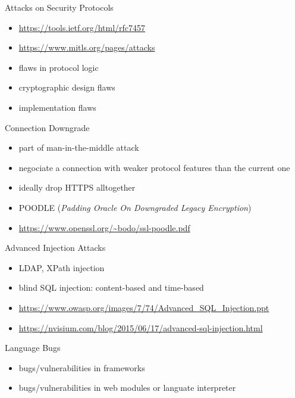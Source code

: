 \documentclass{curs}
\begin{document}
\begin{frame}{Attacks on Security Protocols}
  \begin{itemize}
    \pause \item \url{https://tools.ietf.org/html/rfc7457}
    \pause \item \url{https://www.mitls.org/pages/attacks}
    \pause \item flaws in protocol logic
    \pause \item cryptographic design flaws
    \pause \item implementation flaws
  \end{itemize}
\end{frame}

\begin{frame}{Connection Downgrade}
  \begin{itemize}
    \pause \item part of man-in-the-middle attack
    \pause \item negociate a connection with weaker protocol features than the current one
    \pause \item ideally drop HTTPS alltogether
    \pause \item POODLE (\textit{Padding Oracle On Downgraded Legacy Encryption})
    \pause \item \url{https://www.openssl.org/~bodo/ssl-poodle.pdf}
  \end{itemize}
\end{frame}

\begin{frame}{Advanced Injection Attacks}
  \begin{itemize}
    \pause \item LDAP, XPath injection
    \pause \item blind SQL injection: content-based and time-based
    \pause \item \url{https://www.owasp.org/images/7/74/Advanced_SQL_Injection.ppt}
    \pause \item \url{https://nvisium.com/blog/2015/06/17/advanced-sql-injection.html}
  \end{itemize}
\end{frame}

\begin{frame}{Language Bugs}
  \begin{itemize}
    \pause \item bugs/vulnerabilities in frameworks
    \pause \item bugs/vulnerabilities in web modules or languate interpreter
  \end{itemize}
\end{frame}
\end{document}
